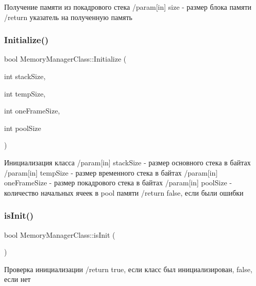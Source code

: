 Получение памяти из покадрового стека /param\mbox{[}in\mbox{]} size -\/ размер блока памяти /return указатель на полученную память 

\mbox{\label{class_memory_manager_class_a7e9132ed8b0a1ba02aed364d507f635f}} 
\subsubsection{\texorpdfstring{Initialize()}{Initialize()}}
{\footnotesize\ttfamily bool Memory\+Manager\+Class\+::\+Initialize (\begin{DoxyParamCaption}\item[{int}]{stack\+Size,  }\item[{int}]{temp\+Size,  }\item[{int}]{one\+Frame\+Size,  }\item[{int}]{pool\+Size }\end{DoxyParamCaption})}

Инициализация класса /param\mbox{[}in\mbox{]} stack\+Size -\/ размер основного стека в байтах /param\mbox{[}in\mbox{]} temp\+Size -\/ размер временного стека в байтах /param\mbox{[}in\mbox{]} one\+Frame\+Size -\/ размер покадрового стека в байтах /param\mbox{[}in\mbox{]} pool\+Size -\/ количество начальных ячеек в pool памяти /return false, если были ошибки \mbox{\label{class_memory_manager_class_a8e3d0ccd0e511f1865ae8fc2805a36a4}} 
\subsubsection{\texorpdfstring{is\+Init()}{isInit()}}
{\footnotesize\ttfamily bool Memory\+Manager\+Class\+::is\+Init (\begin{DoxyParamCaption}{ }\end{DoxyParamCaption})\hspace{0.3cm}{\ttfamily [static]}}



Проверка инициализации /return true, если класс был инициализирован, false, если нет 

\mbox{\label{class_memory_manager_class_aa3606f18bbcc8d10cbb63ed173c62f43}} 
